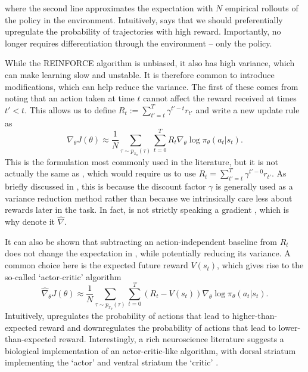 where the second line approximates the expectation with $N$ empirical rollouts of the policy in the environment.
Intuitively,  says that we should preferentially upregulate the probability of trajectories with high reward.
Importantly,  no longer requires differentiation through the environment -- only the policy.

While the REINFORCE algorithm is unbiased, it also has high variance, which can make learning slow and unstable.
It is therefore common to introduce modifications, which can help reduce the variance.
The first of these comes from noting that an action taken at time $t$ cannot affect the reward received at times $t'<t$.
This allows us to define $R_t := \sum_{t'=t}^T \gamma^{t'-t} r_{t'}$ and write a new update rule as
\begin{equation}
    \label{eq:reinforce}
    \hat{\nabla}_\theta J(\theta) \approx \frac{1}{N} \sum_{\tau \sim p_{\pi_\theta}(\tau)}  \sum_{t=0}^T R_t \nabla_\theta \log \pi_\theta (a_t|s_t).
\end{equation}
This is the formulation most commonly used in the literature, but it is not actually the same as , which would require us to use $R_t = \sum_{t'=t}^T \gamma^{t'-0} r_{t'}$.
As briefly discussed in , this is because the discount factor $\gamma$ is generally used as a variance reduction method rather than because we intrinsically care less about rewards later in the task.
In fact,  is not strictly speaking a gradient \citep{nota2019policy}, which is why denote it $\hat{\nabla}$.

It can also be shown that subtracting an action-independent baseline from $R_t$ does not change the expectation in , while potentially reducing its variance.
A common choice here is the expected future reward $V(s_t)$, which gives rise to the so-called `actor-critic' algorithm
\begin{equation}
    \label{eq:AC}
    \hat{\nabla}_\theta J(\theta) \approx \frac{1}{N} \sum_{\tau \sim p_{\pi_\theta}(\tau)}  \sum_{t=0}^T (R_t - V(s_t)) \nabla_\theta \log \pi_\theta (a_t|s_t).
\end{equation}
Intuitively,  upregulates the probability of actions that lead to higher-than-expected reward and downregulates the probability of actions that lead to lower-than-expected reward.
Interestingly, a rich neuroscience literature suggests a biological implementation of an actor-critic-like algorithm, with dorsal striatum implementing the `actor' and ventral striatum the `critic' \citep{takahashi2008silencing,sutton2018reinforcement}.

